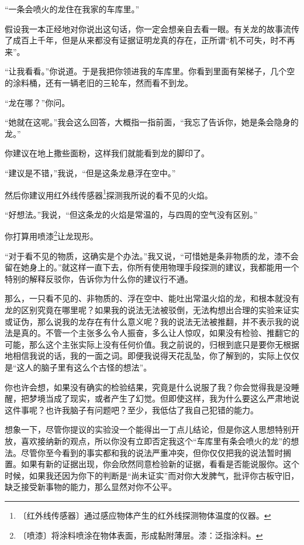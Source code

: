\documentclass[12pt,UTF-8,openany]{ctexbook}
\begin{document}
\begin{large}
    
    “一条会喷火的龙住在我家的车库里。”
    
    假设我一本正经地对你说出这句话，你一定会想亲自去看一眼。有关龙的故事流传了成百上千年，但是从来都没有证据证明龙真的存在，正所谓“机不可失，时不再来”。
    
    “让我看看。”你说道。于是我把你领进我的车库里。你看到里面有架梯子，几个空的涂料桶，还有一辆老旧的三轮车，然而看不到龙。
    
    “龙在哪？”你问。
    
    “她就在这呢。”我会这么回答，大概指一指前面，“我忘了告诉你，她是条会隐身的龙。”
    
    你建议在地上撒些面粉，这样我们就能看到龙的脚印了。
    
    “建议是不错，”我说，“但是这条龙悬浮在空中。”
    
    然后你建议用红外线传感器\footnote{〔红外线传感器〕通过感应物体产生的红外线探测物体温度的仪器。}探测我所说的看不见的火焰。
    
    “好想法。”我说，“但这条龙的火焰是常温的，与四周的空气没有区别。”
    
    你打算用喷漆\footnote{〔喷漆〕将涂料喷涂在物体表面，形成黏附薄层。漆：泛指涂料。}让龙现形。
    
    “对于看不见的物质，这确实是个办法。”我又说，“可惜她是条非物质的龙，漆不会留在她身上的。”就这样一直下去，你所有使用物理手段探测的建议，我都能用一个特别的解释反驳你，告诉你为什么你的建议行不通。
    
    那么，一只看不见的、非物质的、浮在空中、能吐出常温火焰的龙，和根本就没有龙的区别究竟在哪里呢？如果我的说法无法被驳倒，无法构想出合理的实验来证实或证伪，那么说我的龙存在有什么意义呢？我的说法无法被推翻，并不表示我的说法是真的。不管一个主张多么令人振奋，多么让人惊叹，如果没有检验、推翻它的可能，那么这个主张实际上没有任何价值。我之前说的，归根到底只是要你无根据地相信我说的话，我的一面之词。即便我说得天花乱坠，你了解到的，实际上仅仅是“这人的脑子里有这么个古怪的想法”。
    
    你也许会想，如果没有确实的检验结果，究竟是什么说服了我？你会觉得我是没睡醒，把梦境当成了现实，或者产生了幻觉。但即使这样，我为什么要这么严肃地说这件事呢？也许我脑子有问题吧？至少，我低估了我自己犯错的能力。
    
    想象一下，尽管你提议的实验没一个能得出一丁点儿结论，但是你这人思想特别开放，喜欢接纳新的观点，所以你没有立即否定我这个“车库里有条会喷火的龙”的想法。尽管你至今看到的事实都和我的说法严重冲突，但你仅仅把我的说法暂时搁置。如果有新的证据出现，你会欣然同意检验新的证据，看看是否能说服你。这个时候，如果我还因为你下的判断是“尚未证实”而对你大发脾气，批评你古板守旧，缺乏接受新事物的能力，那么显然对你不公平。
    

\end{large}
\end{document}
